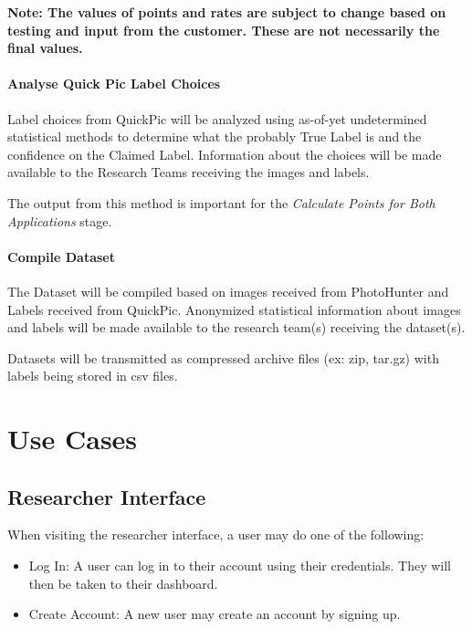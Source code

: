 \documentclass{article}
\begin{document}
\textbf{Note: The values of points and rates are subject to change based on
  testing and input from the customer.  These are not necessarily the final
values.}

\paragraph{Analyse Quick Pic Label Choices}

Label choices from QuickPic will be analyzed using as-of-yet undetermined
statistical methods to determine what the probably True Label is and the
confidence on the Claimed Label.  Information about the choices will be made
available to the Research Teams receiving the images and labels.

The output from this method is important for the \textit{Calculate Points for
Both Applications} stage.

\paragraph{Compile Dataset}

The Dataset will be compiled based on images received from PhotoHunter and
Labels received from QuickPic.  Anonymized statistical information about images
and labels will be made available to the research team(s) receiving the
dataset(s).

Datasets will be transmitted as compressed archive files (ex: zip, tar.gz) with
labels being stored in csv files.

\section{Use Cases}
\subsection{Researcher Interface}
When visiting the researcher interface, a user may do one of the following:
\begin{itemize}
  \item Log In: A user can log in to their account using their credentials. They will then be taken to their dashboard.
  \item Create Account: A new user may create an account by signing up.
\end{itemize}
\end{document}
